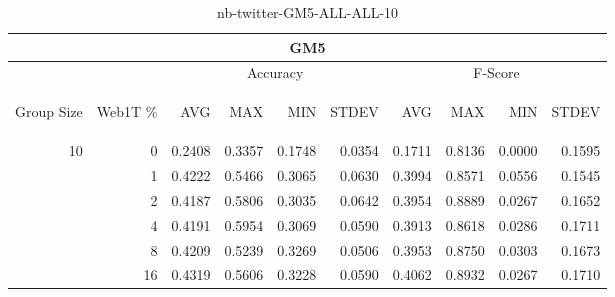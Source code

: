 \begin{center}
\begin{table}[htbp]
\begin{center}
\begin{tabular}{ | r | r | r | r | r | r | r | r | r | r |}
\hline
\multicolumn{10}{|c|}{GM5}\\
\hline
 & & \multicolumn{4}{|c|}{Accuracy} & \multicolumn{4}{|c|}{F-Score}\\ \cline{3-10}
\begin{sideways}Group Size\end{sideways} & \begin{sideways}Web1T \%\end{sideways} & \begin{sideways}AVG\end{sideways} & \begin{sideways}MAX\end{sideways} & \begin{sideways}MIN\end{sideways} & \begin{sideways}STDEV\end{sideways} & \begin{sideways}AVG\end{sideways} & \begin{sideways}MAX\end{sideways} & \begin{sideways}MIN\end{sideways} & \begin{sideways}STDEV\end{sideways}\\
\hline
\multirow{5}{*}{10}
 & 0 & 0.2408 & 0.3357 & 0.1748 & 0.0354 & 0.1711 & 0.8136 & 0.0000 & 0.1595\\ \cline{2-10}
 & 1 & 0.4222 & 0.5466 & 0.3065 & 0.0630 & 0.3994 & 0.8571 & 0.0556 & 0.1545\\ \cline{2-10}
 & 2 & 0.4187 & 0.5806 & 0.3035 & 0.0642 & 0.3954 & 0.8889 & 0.0267 & 0.1652\\ \cline{2-10}
 & 4 & 0.4191 & 0.5954 & 0.3069 & 0.0590 & 0.3913 & 0.8618 & 0.0286 & 0.1711\\ \cline{2-10}
 & 8 & 0.4209 & 0.5239 & 0.3269 & 0.0506 & 0.3953 & 0.8750 & 0.0303 & 0.1673\\ \cline{2-10}
 & 16 & 0.4319 & 0.5606 & 0.3228 & 0.0590 & 0.4062 & 0.8932 & 0.0267 & 0.1710\\ \cline{2-10}
\hline
\end{tabular}
\caption{nb-twitter-GM5-ALL-ALL-10}
\label{table:nb-twitter-GM5-ALL-ALL-10}
\end{center}
\end{table}
\end{center}

